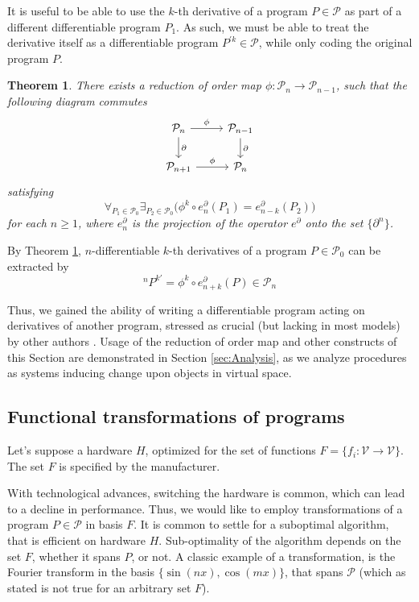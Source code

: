 \documentclass[smallcondensed]{svjour3}
\newcommand{\VV}{\mathcal{V}}
\newcommand{\dP}{\mathcal{P}}
\newcommand{\D}{\partial}
\newtheorem{izrek}{Theorem}[section]
\begin{document}
 It is useful to be able to use the $k$-th derivative of a program $P\in\dP$ as part of a different differentiable program $P_1$. As such, we must be able to treat the derivative itself as a differentiable program $P^{\prime k}\in\dP$, while only coding the original program $P$. 
\begin{izrek}\label{izr:reductionMap}
There exists a reduction of order map $\phi:\dP_n\to \dP_{n-1}$, such that the
following  diagram commutes
\begin{equation}\label{eq:reductionMap}
\begin{tikzcd}
  \dP_n \arrow{r}{\phi} \arrow{d}{\D} & 
  \dP_{n-1} \arrow{d}{\D}\\
  \dP_{n+1} \arrow{r}{\phi} & 
  \dP_{n}
\end{tikzcd}
\end{equation}
satisfying
\begin{equation}
\forall_{P_1\in\dP_0}\exists_{P_2\in\dP_0}\Big(\phi^k\circ e^\D_n(P_1)=e^\D_{n-k}(P_2)\Big)
\end{equation}
for each $n\ge 1$, where $e^\D_n$ is the projection of the operator $e^\D$ onto the set $\{\D^n\}$.
\end{izrek}  
\begin{corollary}\label{cor:extraxtDerivatives}
By Theorem \ref{izr:reductionMap}, $n$-differentiable $k$-th derivatives of a program $P\in\dP_0$ can be extracted by
\begin{equation}
^{n}P^{k\prime}=\phi^k\circ e^\D_{n+k}(P)\in\dP_n
\end{equation}
\end{corollary}    
 Thus, we gained the ability of writing a differentiable program acting on derivatives of another program, stressed as crucial (but lacking in most models) by other authors \cite{AD1}. Usage of the reduction of order map and other constructs of this Section are demonstrated in Section \ref{sec:Analysis}, as we analyze procedures as systems inducing change upon objects in virtual space.
 
   \subsection{Functional transformations of programs}\label{sec:FTP}
   
   Let's suppose a hardware $H$, optimized for the set of functions
   $F=\{f_i:\VV\to \VV\}$. The set $F$ is specified by the manufacturer.  
   
   With technological advances, switching the hardware is common, which can lead
   to a decline in performance.  Thus, we would like to employ transformations
   of a program $P\in\dP$ in basis $F$. It is common to settle for a suboptimal
   algorithm, that is efficient on hardware $H$. Sub-optimality of the algorithm
   depends on the set $F$, whether it spans $P$, or not. A classic example of a
   transformation, is the Fourier transform in the basis $\{\sin(nx),
   \cos(mx)\}$, that spans $\dP$ (which as stated is not true for an arbitrary
   set $F$).
   
\end{document}

